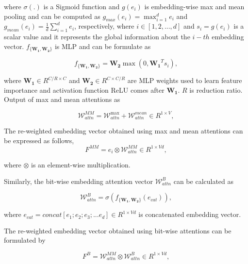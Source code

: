 \documentclass{article}
\begin{document}
\noindent where $\sigma(.)$ is a Sigmoid function and $g(e_{i})$ is embedding-wise max and mean pooling and can be computed as $g_{max}(e_{i}) = \max_{i=1}^{d} e_i$ and $ g_{mean}(e_{i}) = \frac{1}{d}\sum^{d}_{i=1}{e_i}$, respectively, where $i \in [1, 2, ..., d ]$ and $s_i = g(e_{i})$ is a scalar value and it represents the global information about the $i-th$ embedding vector. $f_{\{\boldsymbol{W_1}, \boldsymbol{W_2}\}}$ is MLP and can be formulate as 



\begin{equation}
f_{\{\boldsymbol{W_1}, \boldsymbol{W_2}\}} = \boldsymbol{W_2} \max(0, \boldsymbol{W_1}^T s_i),
\end{equation}

\noindent where $\boldsymbol{W_1} \in R^{{C/R}\times C}$ and $\boldsymbol{W_2} \in R^{C\times {C/R}}$ are MLP weights used to learn feature importance and activation function ReLU comes after $\boldsymbol{W_1}$. $R$ is reduction ratio. Output of max and mean attentions as

\begin{equation}
\mathcal{W}^{MM}_{attn} = \mathcal{W}^{\max}_{attn} + \mathcal{W}^{mean}_{attn} \in R^{1\times V},
\end{equation}

The re-weighted embedding vector obtained using max and mean attentions can be expressed as follows,
\begin{equation}
{F}^{MM} = e_i\otimes \mathcal{W}^{MM}_{attn} \in R^{1\times Vd},
\end{equation}


\noindent where $\otimes$ is an element-wise multiplication.

Similarly, the bit-wise embedding attention vector $\mathcal{W}^{B}_{attn}$ can be calculated as

\begin{equation}
\mathcal{W}^{B}_{attn} = \sigma(f_{\{\boldsymbol{W_1}, \boldsymbol{W_2}\}}(e_{cat})),
\end{equation}

\noindent where $e_{cat} = concat[e_1; e_2; e_3; ... e_d] \in R^{1\times Vd}$ is concatenated embedding vector.

\noindent The re-weighted embedding vector obtained using bit-wise attentions can be formulated by

\begin{equation}
{F}^{B} =\mathcal{W}^{MM}_{attn}\otimes \mathcal{W}^{B}_{attn} \in R^{1\times Vd},
\end{equation}
\end{document}
